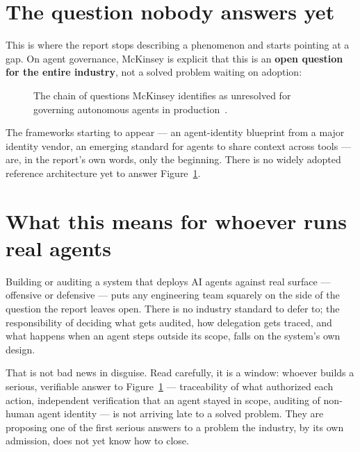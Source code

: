 \documentclass[10pt]{article}
\begin{document}
\section{The question nobody answers yet}

This is where the report stops describing a phenomenon and starts pointing at a gap. On agent governance, McKinsey is explicit that this is an \textbf{open question for the entire industry}, not a solved problem waiting on adoption:

\begin{figure}[h]
\centering
{}
\caption{The chain of questions McKinsey identifies as unresolved for governing autonomous agents in production~\cite{mckinsey2026}.}
\label{fig:governance}
\end{figure}

The frameworks starting to appear --- an agent-identity blueprint from a major identity vendor, an emerging standard for agents to share context across tools --- are, in the report's own words, only the beginning. There is no widely adopted reference architecture yet to answer Figure~\ref{fig:governance}.

\section{What this means for whoever runs real agents}

Building or auditing a system that deploys AI agents against real surface --- offensive or defensive --- puts any engineering team squarely on the side of the question the report leaves open. There is no industry standard to defer to; the responsibility of deciding what gets audited, how delegation gets traced, and what happens when an agent steps outside its scope, falls on the system's own design.

That is not bad news in disguise. Read carefully, it is a window: whoever builds a serious, verifiable answer to Figure~\ref{fig:governance} --- traceability of what authorized each action, independent verification that an agent stayed in scope, auditing of non-human agent identity --- is not arriving late to a solved problem. They are proposing one of the first serious answers to a problem the industry, by its own admission, does not yet know how to close.
\end{document}
